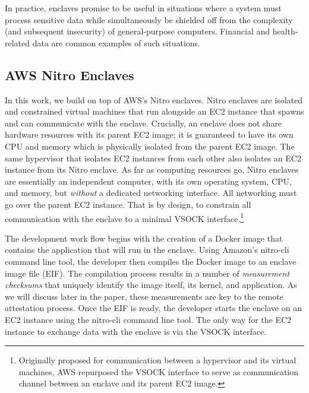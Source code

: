 In practice, enclaves promise to be useful in situations where a system must
process sensitive data while simultaneously be shielded off from the complexity
(and subsequent insecurity) of general-purpose computers. Financial and
health-related data are common examples of such situations.

\subsection{AWS Nitro Enclaves}
\label{sec:nitro}

In this work, we build on top of AWS's Nitro enclaves.  Nitro enclaves are
isolated and constrained virtual machines that run alongside an EC2 instance
that spawns and can communicate with the enclave.  Crucially, an enclave does
not share hardware resources with its parent EC2 image; it is guaranteed to
have its own CPU and memory which is physically isolated from the parent EC2
image.  The same hypervisor that isolates EC2 instances from each other also
isolates an EC2 instance from its Nitro enclave.  As far as computing resources
go, Nitro enclaves are essentially an independent computer, with its own
operating system, CPU, and memory, but \emph{without} a dedicated networking
interface.  All networking must go over the parent EC2 instance.  That is by
design, to constrain all communication with the enclave to a minimal VSOCK
interface.\footnote{Originally proposed for communication between a hypervisor
and its virtual machines, AWS repurposed the VSOCK interface to serve as
communication channel between an enclave and its parent EC2 image.}

The development work flow begins with the creation of a Docker image that
contains the application that will run in the enclave.  Using Amazon's
nitro-cli command line tool, the developer then compiles the Docker image to an
enclave image file (EIF).  The compilation process results in a number of
\emph{measurement checksums} that uniquely identify the image itself, its
kernel, and application.  As we will discuss later in the paper, these
measurements are key to the remote attestation process.
%
Once the EIF is ready, the developer starts the enclave on an EC2 instance
using the nitro-cli command line tool.  The only way for the EC2 instance to
exchange data with the enclave is via the VSOCK interface.
